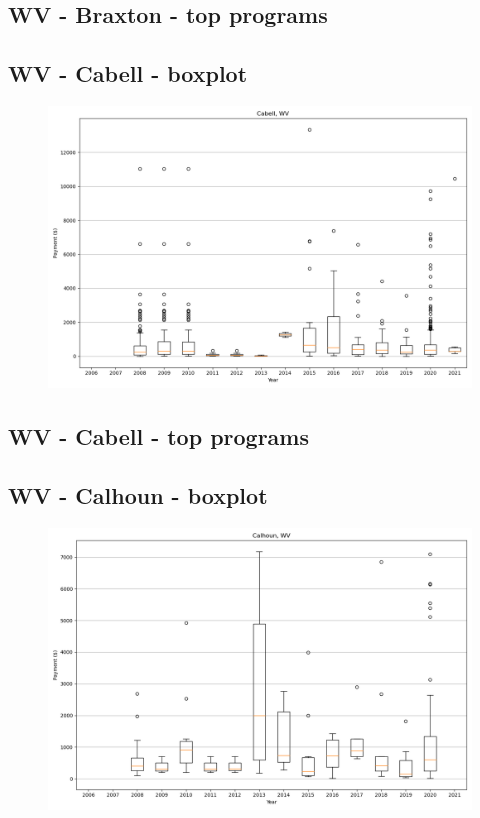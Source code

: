 \subsection*{WV - Braxton - top programs}

\newpage
\subsection*{WV - Cabell - boxplot}
\begin{figure}[h]
\centering
\includegraphics[width=7in]{../output/boxplots/counties/Cabell-WV_boxplot.png}
\end{figure}


\subsection*{WV - Cabell - top programs}

\newpage
\subsection*{WV - Calhoun - boxplot}
\begin{figure}[h]
\centering
\includegraphics[width=7in]{../output/boxplots/counties/Calhoun-WV_boxplot.png}
\end{figure}


